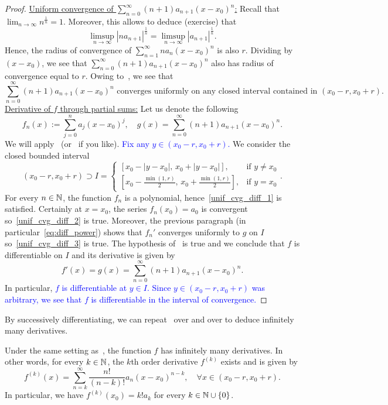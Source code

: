 \begin{proof}
	\ul{Uniform convergence of $\sum_{n=0}^\infty (n+1)a_{n+1}(x-x_0)^n$:} Recall that $\lim_{n\to\infty} n^\frac{1}{n} =1$. Moreover, this allows to deduce (exercise) that
	\[
	\limsup_{n\to \infty}|na_{n+1}|^\frac{1}{n} = \limsup_{n\to\infty}|a_{n+1}|^\frac{1}{n}.
	\]
	Hence, the radius of convergence of $\sum_{n=1}^\infty na_n(x-x_0)^n$ is also $r$. Dividing by $(x-x_0)$, we see that $\sum_{n=0}^\infty (n+1)a_{n+1}(x-x_0)^n$ also has radius of convergence equal to $r$. Owing to~, we see that
	\begin{equation}
		\label{eq:diff_power}
		\sum_{n=0}^\infty (n+1)a_{n+1}(x-x_0)^n\text{ converges uniformly on any closed interval contained in }(x_0-r,x_0+r).
	\end{equation}
	\ul{Derivative of $f$ through partial sums:} Let us denote the following
	\[
	f_n(x):= \sum_{j=0}^n a_j(x-x_0)^j,\quad g(x) = \sum_{n=0}^\infty (n+1)a_{n+1}(x-x_0)^n.
	\]
	We will apply~ (or~ if you like). \textcolor{blue}{Fix any $y \in (x_0-r,x_0+r)$.} We consider the closed bounded interval
	\[
	(x_0-r,x_0+r)\supset I = \left\{
	\begin{array}{cl}
		[x_0-|y-x_0|,\,x_0+|y-x_0|], 	&\text{if }y\neq x_0 	\\
		\left[x_0 - \frac{\min(1,r)}{2},\,x_0 + \frac{\min(1,r)}{2}\right], 	&\text{if }y = x_0
	\end{array}
	\right..
	\]
	For every $n\in\mathbb{N}$, the function $f_n$ is a polynomial, hence~\ref{unif_cvg_diff_1} is satisfied. Certainly at $x=x_0$, the series $f_n(x_0) = a_0$ is convergent so~\ref{unif_cvg_diff_2} is true. Moreover, the previous paragraph (in particular~\eqref{eq:diff_power}) shows that $f_n'$ converges uniformly to $g$ on $I$ so~\ref{unif_cvg_diff_3} is true. The hypothesis of~ is true and we conclude that $f$ is differentiable on $I$ and its derivative is given by
	\[
	f'(x) = g(x) = \sum_{n=0}^\infty (n+1)a_{n+1}(x-x_0)^n.
	\]
	In particular, \textcolor{blue}{$f$ is differentiable at $y\in I$. Since $y\in(x_0-r,x_0+r)$ was arbitrary, we see that $f$ is differentiable in the interval of convergence.}
\end{proof}
By successively differentiating, we can repeat~ over and over to deduce infinitely many derivatives.
\begin{cor}
	\label{cor:analytic}
	Under the same setting as~, the function $f$ has infinitely many derivatives. In other words, for every $k\in\mathbb{N}$, the $k$th order derivative $f^{(k)}$ exists and is given by
	\[
	f^{(k)}(x) = \sum_{n=k}^\infty \frac{n!}{(n-k)!}a_n(x-x_0)^{n-k},\quad \forall x\in (x_0-r,x_0+r).
	\]
	In particular, we have $f^{(k)}(x_0) = k!a_k$ for every $k\in\mathbb{N}\cup \{0\}$.
\end{cor}
